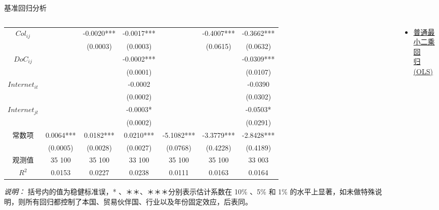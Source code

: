 \documentclass{beamer}
\begin{document}
\begin{frame}{基准回归分析}
\begin{columns}[T]
\begin{column}{0.8\textwidth}
{\begin{threeparttable}
\begin{tabular}{ccccccc}
                        $Col_{ij}$ & & -0.0020*** & -0.0017*** & & -0.4007*** & -0.3662*** \\
                        & & (0.0003) & (0.0003) & & (0.0615) & (0.0632) \\
                        $DoC_{ij}$ & & & -0.0002*** & & & -0.0309*** \\
                        & & & (0.0001) & & & (0.0107) \\
                        $Internet_{it}$ & & & -0.0002 & & & -0.0390 \\
                        & & & (0.0002) & & & (0.0302) \\
                        $Internet_{jt}$ & & & -0.0003* & & & -0.0503* \\
                        & & & (0.0002) & & & (0.0291) \\
                        常数项 & 0.0064*** & 0.0182*** & 0.0210*** & -5.1082*** & -3.3779*** & -2.8428*** \\
                        & (0.0005) & (0.0028) & (0.0027) & (0.0768) & (0.4228) & (0.4189) \\
                        观测值 & 35 100 & 35 100 & 33 100 & 35 100 & 35 100 & 33 003 \\
                        $R^2$ & 0.0153 & 0.0227 & 0.0238 & 0.0111 & 0.0163 & 0.0164 \\
                        \bottomrule
                    \end{tabular}
                    \begin{tablenotes}
                        \item \textit{说明：} 括号内的值为稳健标准误，* 、＊＊、＊＊＊分别表示估计系数在 10\% 、5\% 和 1\% 的水平上显著，如未做特殊说明，则所有回归都控制了本国、贸易伙伴国、行业以及年份固定效应，后表同。
                    \end{tablenotes}
                \end{threeparttable}
            }
        \end{column}
        \begin{column}{0.3\textwidth}
            \vspace*{3em}
            \footnotesize
            \begin{itemize}
                \item \uline{
                    普通最小二乘回 \\
                    归(OLS)
                    } \\
                \begin{scriptsize}

\end{scriptsize}
\end{itemize}
\end{column}
\end{columns}
\end{frame}
\end{document}
